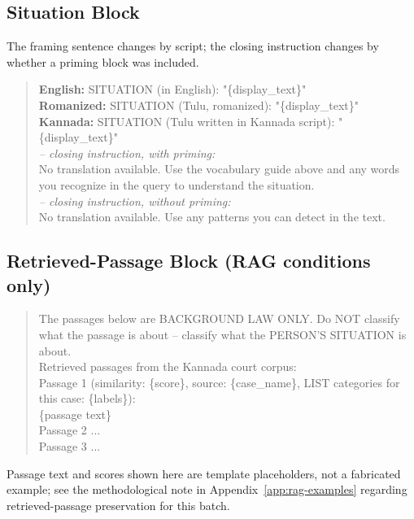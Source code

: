 \documentclass[11pt]{article}
\begin{document}
\subsection{Situation Block}
\label{app:prompt-situation}

The framing sentence changes by script; the closing instruction changes by
whether a priming block was included.

\begin{quote}
\ttfamily\small
\textbf{English:} SITUATION (in English): "\{display\_text\}"\\[4pt]
\textbf{Romanized:} SITUATION (Tulu, romanized): "\{display\_text\}"\\[4pt]
\textbf{Kannada:} SITUATION (Tulu written in Kannada script): "\{display\_text\}"\\[8pt]
\textit{-- closing instruction, with priming:}\\
No translation available. Use the vocabulary guide above and any words you recognize in the query to understand the situation.\\[4pt]
\textit{-- closing instruction, without priming:}\\
No translation available. Use any patterns you can detect in the text.
\end{quote}

\subsection{Retrieved-Passage Block (RAG conditions only)}
\label{app:prompt-rag}

\begin{quote}
\ttfamily\small
The passages below are BACKGROUND LAW ONLY. Do NOT classify what the passage is about -- classify what the PERSON'S SITUATION is about.\\
Retrieved passages from the Kannada court corpus:\\[4pt]
Passage 1 (similarity: \{score\}, source: \{case\_name\}, LIST categories for this case: \{labels\}):\\
\{passage text\}\\[4pt]
Passage 2 ...\\
Passage 3 ...
\end{quote}

\noindent Passage text and scores shown here are template placeholders, not
a fabricated example; see the methodological note in
Appendix~\ref{app:rag-examples} regarding retrieved-passage preservation for
this batch.
\end{document}
